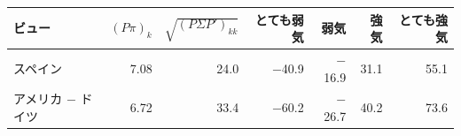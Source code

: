 \begin{tabular}{lrrrrrr}
\toprule
ビュー & $(P\pi)_k$ & $\sqrt{(P\Sigma P')_{kk}}$ & とても弱気 & 弱気 & 強気 & とても強気 \\
\midrule
スペイン & 7.08 & 24.0 & \ensuremath{-}40.9 & \ensuremath{-}16.9 & 31.1 & 55.1 \\
アメリカ $-$ ドイツ & 6.72 & 33.4 & \ensuremath{-}60.2 & \ensuremath{-}26.7 & 40.2 & 73.6 \\
\bottomrule
\end{tabular}
